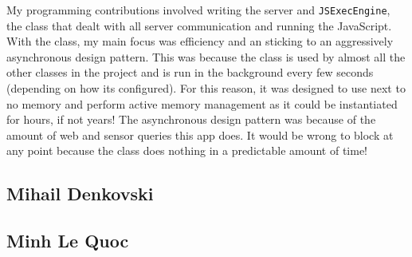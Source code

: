 \documentclass{article}
\begin{document}
My programming contributions involved writing the server and \texttt{JSExecEngine}, the class that dealt with all server communication and
running the JavaScript. With the class, my main focus was efficiency and an sticking to an aggressively asynchronous design pattern. This was
because the class is used by almost all the other classes in the project and is run in the background every few seconds (depending on how its configured).
For this reason, it was designed to use next to no memory and perform active memory management as it could be instantiated for hours, if not years!
The asynchronous design pattern was because of the amount of web and sensor queries this app does. It would be wrong to block at any point because
the class does nothing in a predictable amount of time!
\subsection{Mihail Denkovski}
\subsection{Minh Le Quoc}
\end{document}
